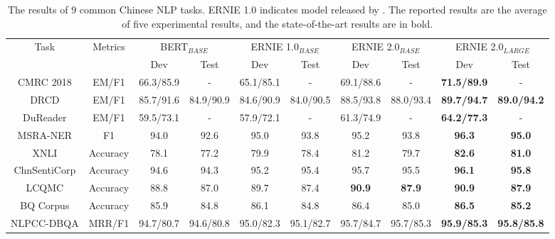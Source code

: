 \documentclass[letterpaper]{article} \usepackage{aaai20}  \usepackage{times}  \usepackage{helvet} \usepackage{courier}  \usepackage[hyphens]{url}  \usepackage{graphicx} \usepackage{makecell}
\begin{document}
\begin{table*}[htbp]
\centering
  \small
\begin{tabular}{c|c|cc|cc|cc|cc}
\hline \hline
\multirow{2}{*}{Task} & \multirow{2}{*}{Metrics} & \multicolumn{2}{c|}{BERT$_{BASE}$} & \multicolumn{2}{c|}{ERNIE 1.0$_{BASE}$} & \multicolumn{2}{c|}{ERNIE 2.0$_{BASE}$} & \multicolumn{2}{c}{ERNIE 2.0$_{LARGE}$} \\ \cline{3-10} 
                      &                          & Dev         & Test        & Dev               & Test             & Dev                 & Test               & Dev                 & Test                \\ \hline
CMRC 2018             & EM/F1                    & 66.3/85.9   & -           & 65.1/85.1         & -                & 69.1/88.6           & -                  & \textbf{71.5/89.9}  & -                   \\
DRCD                  & EM/F1                    & 85.7/91.6   & 84.9/90.9   & 84.6/90.9         & 84.0/90.5        & 88.5/93.8           & 88.0/93.4          & \textbf{89.7/94.7}  & \textbf{89.0/94.2}  \\
DuReader              & EM/F1                    & 59.5/73.1   & -           & 57.9/72.1         & -                & 61.3/74.9           & -                  & \textbf{64.2/77.3}  & -                   \\
MSRA-NER              & F1                       & 94.0        & 92.6        & 95.0              & 93.8             & 95.2                & 93.8               & \textbf{96.3}       & \textbf{95.0}       \\
XNLI                  & Accuracy                 & 78.1        & 77.2        & 79.9              & 78.4             & 81.2                & 79.7               & \textbf{82.6}       & \textbf{81.0}       \\
ChnSentiCorp          & Accuracy                 & 94.6        & 94.3       & 95.2              & 95.4             & 95.7                & 95.5               & \textbf{96.1}       & \textbf{95.8}       \\
LCQMC                 & Accuracy                 & 88.8        & 87.0        & 89.7              & 87.4             & \textbf{90.9}       & \textbf{87.9}      & \textbf{90.9}       & \textbf{87.9}       \\
BQ Corpus             & Accuracy                 & 85.9        & 84.8        & 86.1              & 84.8             & 86.4                & 85.0               & \textbf{86.5}       & \textbf{85.2}       \\
NLPCC-DBQA            & MRR/F1                   & 94.7/80.7   & 94.6/80.8   & 95.0/82.3         & 95.1/82.7        & 95.7/84.7           & 95.7/85.3          & \textbf{95.9/85.3}           & \textbf{95.8/85.8}           \\ \hline \hline

\end{tabular}
\caption{The results of 9 common Chinese NLP tasks. ERNIE 1.0 indicates model released by \protect\cite[ERNIE]{sun2019ernie} . The reported results are the average of five experimental results, and the state-of-the-art results are in bold.}
  \label{finetune_table}
\end{table*}
\end{document}
